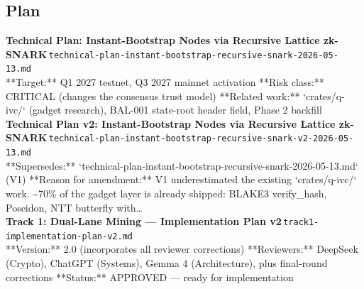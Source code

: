 \documentclass[11pt,a4paper]{article}
\begin{document}
\subsection*{Plan}
\noindent\textbf{Technical Plan: Instant-Bootstrap Nodes via Recursive Lattice zk-SNARK}\,\textcolor{qgray}{\small \texttt{technical-plan-instant-bootstrap-recursive-snark-2026-05-13.md}}\\
**Target:** Q1 2027 testnet, Q3 2027 mainnet activation **Risk class:** CRITICAL (changes the consensus trust model) **Related work:** `crates/q-ivc/` (gadget research), BAL-001 state-root header field, Phase 2 backfill\\[6pt]
\noindent\textbf{Technical Plan v2: Instant-Bootstrap Nodes via Recursive Lattice zk-SNARK}\,\textcolor{qgray}{\small \texttt{technical-plan-instant-bootstrap-recursive-snark-v2-2026-05-13.md}}\\
**Supersedes:** `technical-plan-instant-bootstrap-recursive-snark-2026-05-13.md` (V1) **Reason for amendment:** V1 underestimated the existing `crates/q-ivc/` work. \textasciitilde{}70\% of the gadget layer is already shipped: BLAKE3 verify\_hash, Poseidon, NTT butterfly with\ldots{}\\[6pt]
\noindent\textbf{Track 1: Dual-Lane Mining --- Implementation Plan v2}\,\textcolor{qgray}{\small \texttt{track1-implementation-plan-v2.md}}\\
**Version:** 2.0 (incorporates all reviewer corrections) **Reviewers:** DeepSeek (Crypto), ChatGPT (Systems), Gemma 4 (Architecture), plus final-round corrections **Status:** APPROVED --- ready for implementation\\[6pt]
\end{document}
